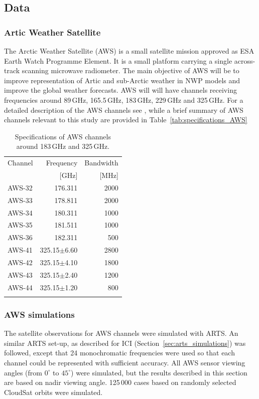 \documentclass[amt, manuscript]{copernicus}
\begin{document}
\subsection{Data}
\subsubsection{Artic Weather Satellite}
The Arctic Weather Satellite (AWS) is a small satellite mission approved as ESA Earth Watch 
Programme Element. It is a small platform carrying a single across-track scanning microwave radiometer. The main objective of AWS will be to improve representation of Artic and sub-Arctic weather in NWP models and improve the global weather forecasts. AWS will will have channels receiving frequencies around 89\,GHz, 165.5\,GHz, 183\,GHz, 229\,GHz and 325\,GHz. For a detailed description of the AWS channels see \citep{eriksson-etal_AWS_2020}, while a brief summary of AWS channels relevant to this study are provided in Table~\ref{tab:specifications_AWS}
\begin{table}[t]
	\label{tab:ICI_MWI_channels}	
	\caption{Specifications of AWS channels around 183\,GHz and 325\,GHz.}
	\begin{tabular}{lrr}
		\tophline
		Channel & Frequency 	& Bandwidth  \\
				& [GHz]			& [MHz]		\\
		\middlehline
		AWS-32	&	176.311    & 2000 		\\
		AWS-33	&	178.811    & 2000 		\\
		AWS-34	&	180.311    & 1000 		\\
		AWS-35	&	181.511    & 1000 		 \\
		AWS-36	&	182.311    & \phantom{0}500 	 \\
	    AWS-41    & 325.15$\pm$6.60    & 2800 \\
		AWS-42    & 325.15$\pm$4.10    & 1800  \\
		AWS-43    & 325.15$\pm$2.40    & 1200 \\
		AWS-44    & 325.15$\pm$1.20    & \phantom{0}800  \\
			\bottomhline
	\end{tabular}
	\belowtable{} %
\end{table}

\subsubsection{AWS simulations}
The satellite observations for AWS channels were simulated with ARTS. An similar ARTS set-up, as described for ICI (Section~\ref{sec:arts_simulations}) was followed, except that 24 monochromatic frequencies were used so that each channel could be represented with sufficient accuracy. All AWS sensor viewing angles (from $0^\circ$ to $45^\circ$) were simulated, but the results described in this section are based on nadir viewing angle. 125\,000 cases based on randomly selected CloudSat orbits were simulated.
\end{document}
